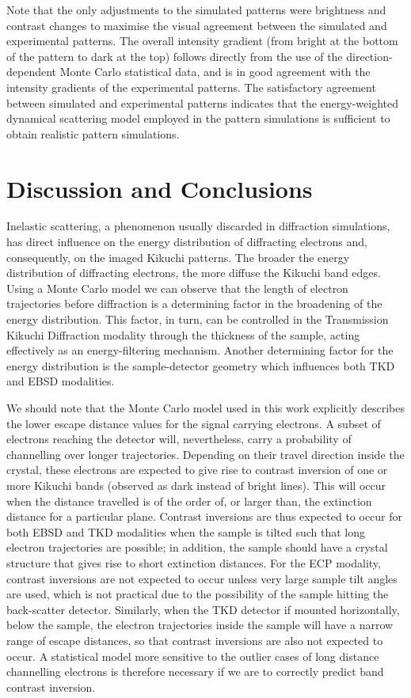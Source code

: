 Note that the only adjustments to the simulated patterns were brightness and contrast changes to maximise the visual agreement between the simulated and experimental patterns.  The overall intensity gradient (from bright at the bottom of the pattern to dark at the top) follows directly from the use of the direction-dependent Monte Carlo statistical data, and is in good agreement with the intensity gradients of the experimental patterns.  The satisfactory agreement between simulated and experimental patterns indicates that the energy-weighted dynamical scattering model employed in the pattern simulations is sufficient to obtain realistic pattern simulations. 




%
\section{Discussion and Conclusions \label{sec:discussion}}

Inelastic scattering, a phenomenon usually discarded in diffraction simulations, has direct influence on the energy distribution of diffracting electrons and, consequently, on the imaged Kikuchi patterns. The broader the energy distribution of diffracting electrons, the more diffuse the Kikuchi band edges. Using a Monte Carlo model we can observe that the length of electron trajectories before diffraction is a determining factor in the broadening of the energy distribution. This factor, in turn, can be controlled in the Transmission Kikuchi Diffraction modality through the thickness of the sample, acting effectively as an energy-filtering mechanism. Another determining factor for the energy distribution is the sample-detector geometry which influences both TKD and EBSD modalities.



We should note that the Monte Carlo model used in this work explicitly describes the lower escape distance values for the signal carrying electrons.  A subset of electrons reaching the detector will, nevertheless, carry a probability of channelling over longer trajectories. Depending on their travel direction inside the crystal, these electrons are expected to give rise to contrast inversion of one or more Kikuchi bands (observed as dark instead of bright lines). This will occur when the distance travelled is of the order of, or larger than, the extinction distance for a particular plane. Contrast inversions are thus expected to occur for both EBSD and TKD modalities when the sample is tilted such that long electron trajectories are possible; in addition, the sample should have a crystal structure that gives rise to short extinction distances. For the ECP modality, contrast inversions are not expected to occur unless very large sample tilt angles are used, which is not practical due to the possibility of the sample hitting the back-scatter detector. Similarly, when the TKD detector if mounted horizontally, below the sample, the electron trajectories inside the sample will have a narrow range of escape distances, so that contrast inversions are also not expected to occur. A statistical model more sensitive to the outlier cases of long distance channelling electrons is therefore necessary if we are to correctly predict band contrast inversion. 

